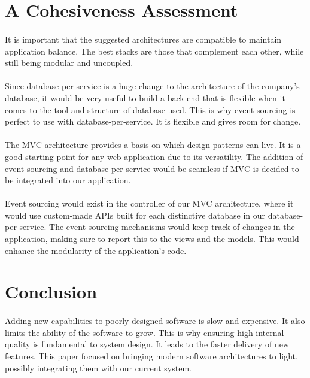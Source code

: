 \documentclass{turabian-researchpaper}
\begin{document}
\clearpage
\section{A Cohesiveness Assessment}
\paragraph{}
It is important that the suggested architectures are compatible to maintain application balance. The best stacks are those that complement each other, while still being modular and uncoupled.\cite{nirmalya_karam_mohsin_2018}
\par
\paragraph{}
Since database-per-service is a huge change to the architecture of the company’s database, it would be very useful to build a back-end that is flexible when it comes to the tool and structure of database used. This is why event sourcing is perfect to use with database-per-service. It is flexible and gives room for change.
\cite{sullivan}
\par
\paragraph{}
The MVC architecture provides a basis on which design patterns can live. It is a good starting point for any web application due to its versatility. The addition of event sourcing and database-per-service would be seamless if MVC is decided to be integrated into our application. 
\par
\paragraph{}
Event sourcing would exist in the controller of our MVC architecture, where it would use custom-made APIs built for each distinctive database in our database-per-service. The event sourcing mechanisms would keep track of changes in the application, making sure to report this to the views and the models. This would enhance the modularity of the application’s code.\cite{wikipedia_2020}
\par
\endsection

\section{Conclusion}
\paragraph{}
Adding new capabilities to poorly designed software is slow and expensive.\cite{fowler} It also limits the ability of the software to grow.\cite{googlesites}
This is why ensuring high internal quality is fundamental to system design. It leads to the faster delivery of new features. This paper focused on bringing modern software architectures to light, possibly integrating them with our current system.
 \par
\end{document}
